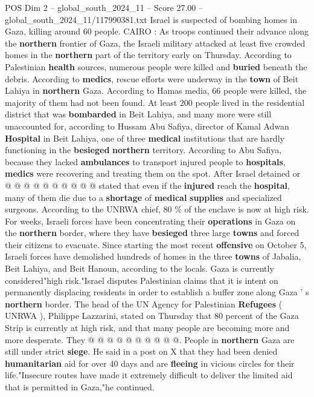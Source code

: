 \begin{textsample}{POS Dim 2 – global\_south\_2024\_11 – Score 27.00 – global\_south\_2024\_11/117990381.txt}  \label{ex:f2_pos_243}
Israel is suspected of bombing homes in Gaza, killing around 60 people.
CAIRO : As troops continued their advance along the \textbf{northern} frontier of Gaza, the Israeli military attacked at least five crowded homes in the \textbf{northern} part of the territory early on Thursday.
According to Palestinian \textbf{health} sources, numerous people were killed and \textbf{buried} beneath the debris.
According to \textbf{medics}, rescue efforts were underway in the \textbf{town} of Beit Lahiya in \textbf{northern} Gaza.
According to Hamas media, 66 people were killed, the majority of them had not been found.
At least 200 people lived in the residential district that was \textbf{bombarded} in Beit Lahiya, and many more were still unaccounted for, according to Hussam Abu Safiya, director of Kamal Adwan \textbf{Hospital} in Beit Lahiya, one of three \textbf{medical} institutions that are hardly functioning in the \textbf{besieged} \textbf{northern} territory.
According to Abu Safiya, because they lacked \textbf{ambulances} to transport injured people to \textbf{hospitals}, \textbf{medics} were recovering and treating them on the spot.
After Israel detained or @ @ @ @ @ @ @ @ @ @ stated that even if the \textbf{injured} reach the \textbf{hospital}, many of them die due to a \textbf{shortage} of \textbf{medical} \textbf{supplies} and specialized surgeons.
According to the UNRWA chief, 80 \% of the enclave is now at high risk.
For weeks, Israeli forces have been concentrating their \textbf{operations} in Gaza on the \textbf{northern} border, where they have \textbf{besieged} three large \textbf{towns} and forced their citizens to evacuate.
Since starting the most recent \textbf{offensive} on October 5, Israeli forces have demolished hundreds of homes in the three \textbf{towns} of Jabalia, Beit Lahiya, and Beit Hanoun, according to the locals.
Gaza is currently considered"high risk."Israel disputes Palestinian claims that it is intent on permanently displacing residents in order to establish a buffer zone along Gaza ' s \textbf{northern} border.
The head of the UN Agency for Palestinian \textbf{Refugees} ( UNRWA ), Philippe Lazzarini, stated on Thursday that 80 percent of the Gaza Strip is currently at high risk, and that many people are becoming more and more desperate.
They @ @ @ @ @ @ @ @ @ @.
People in \textbf{northern} Gaza are still under strict \textbf{siege}.
He said in a post on X that they had been denied \textbf{humanitarian} aid for over 40 days and are \textbf{fleeing} in vicious circles for their life."Insecure routes have made it extremely difficult to deliver the limited aid that is permitted in Gaza,"he continued.

\end{textsample}
